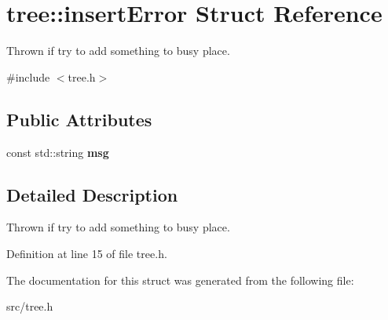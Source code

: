 \hypertarget{structtree_1_1insertError}{\section{tree\-:\-:insert\-Error Struct Reference}
\label{structtree_1_1insertError}
}


Thrown if try to add something to busy place.  




{\ttfamily \#include $<$tree.\-h$>$}

\subsection*{Public Attributes}
\begin{DoxyCompactItemize}
\item 
\hypertarget{structtree_1_1insertError_a62d00b695dc858613b66fe451c160b2c}{const std\-::string {\bfseries msg}}\label{structtree_1_1insertError_a62d00b695dc858613b66fe451c160b2c}

\end{DoxyCompactItemize}


\subsection{Detailed Description}
Thrown if try to add something to busy place. 

Definition at line 15 of file tree.\-h.



The documentation for this struct was generated from the following file\-:\begin{DoxyCompactItemize}
\item 
src/tree.\-h\end{DoxyCompactItemize}
